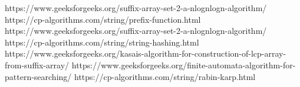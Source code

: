 \documentclass[12pt]{article}
\begin{document}
    	\begin{thebibliography}{0}
    		
    		https://www.geeksforgeeks.org/suffix-array-set-2-a-nlognlogn-algorithm/
    		https://cp-algorithms.com/string/prefix-function.html
    		https://www.geeksforgeeks.org/suffix-array-set-2-a-nlognlogn-algorithm/
    		https://cp-algorithms.com/string/string-hashing.html
    		https://www.geeksforgeeks.org/kasais-algorithm-for-construction-of-lcp-array-from-suffix-array/
    		https://www.geeksforgeeks.org/finite-automata-algorithm-for-pattern-searching/
    		https://cp-algorithms.com/string/rabin-karp.html
    	\end{thebibliography}
    
    
\end{document}
